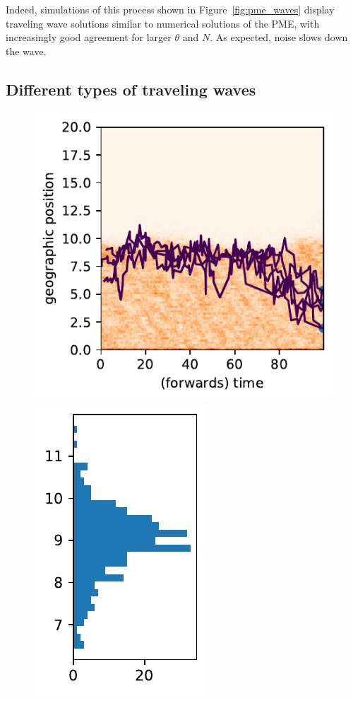 \documentclass[12pt]{article}
\begin{document}
Indeed, simulations of this process
shown in Figure~\ref{fig:pme_waves}
display traveling wave solutions
similar to numerical solutions of the PME,
with increasingly good agreement for larger $\theta$ and $N$.
As expected, noise slows down the wave.


\subsection{Different types of traveling waves}

\begin{figure}
    \begin{center}
        \includegraphics{figures/ex3_fkpp/fkpp_123.lineages}
        \includegraphics{figures/ex3_fkpp/fkpp_123.lineagehist}

\end{center}
\end{figure}
\end{document}
